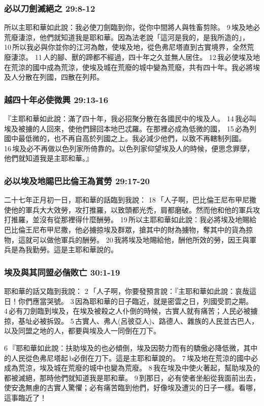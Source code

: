 \subsubsection{必以刀劍滅絕之 29:8-12}
所以主耶和華如此說：我必使刀劍臨到你，從你中間將人與牲畜剪除。 9 埃及地必荒廢淒涼，他們就知道我是耶和華。因為法老說「這河是我的，是我所造的」， 10 所以我必與你並你的江河為敵，使埃及地，從色弗尼塔直到古實境界，全然荒廢淒涼。 11 人的腳、獸的蹄都不經過，四十年之久並無人居住。 12 我必使埃及地在荒涼的國中成為荒涼，使埃及城在荒廢的城中變為荒廢，共有四十年。我必將埃及人分散在列國，四散在列邦。


\subsubsection{越四十年必使微興 29:13-16}
『主耶和華如此說：滿了四十年，我必招聚分散在各國民中的埃及人。 14 我必叫埃及被擄的人回來，使他們歸回本地巴忒羅。在那裡必成為低微的國， 15 必為列國中最低微的，也不再自高於列國之上。我必減少他們，以致不再轄制列國。 16 埃及必不再做以色列家所倚靠的。以色列家仰望埃及人的時候，便思念罪孽，他們就知道我是主耶和華。』

\subsubsection{必以埃及地賜巴比倫王為賞勞 29:17-20}
二十七年正月初一日，耶和華的話臨到我說： 18 「人子啊，巴比倫王尼布甲尼撒使他的軍兵大大效勞，攻打推羅，以致頭都光禿，肩都磨破。然而他和他的軍兵攻打推羅，並沒有從那裡得什麼酬勞。 19 所以主耶和華如此說：我必將埃及地賜給巴比倫王尼布甲尼撒，他必擄掠埃及群眾，搶其中的財為擄物，奪其中的貨為掠物，這就可以做他軍兵的酬勞。 20 我將埃及地賜給他，酬他所效的勞，因王與軍兵是為我勤勞。這是主耶和華說的。

\subsubsection{埃及與其同盟必偕敗亡 30:1-19}
耶和華的話又臨到我說： 2 「人子啊，你要發預言說：『主耶和華如此說：哀哉這日！你們應當哭號。 3 因為耶和華的日子臨近，就是密雲之日，列國受罰之期。 4 必有刀劍臨到埃及，在埃及被殺之人仆倒的時候，古實人就有痛苦；人民必被擄掠，基址必被拆毀。 5 古實人、弗人(呂彼亞人)、路德人、雜族的人民並古巴人，以及同盟之地的人，都要與埃及人一同倒在刀下。

6 『耶和華如此說：扶助埃及的也必傾倒，埃及因勢力而有的驕傲必降低微，其中的人民從色弗尼塔起 b必倒在刀下。這是主耶和華說的。 7 埃及地在荒涼的國中必成為荒涼，埃及城在荒廢的城中也變為荒廢。 8 我在埃及中使火著起，幫助埃及的都被滅絕，那時他們就知道我是耶和華。 9 到那日，必有使者坐船從我面前出去，使安逸無慮的古實人驚懼；必有痛苦臨到他們，好像埃及遭災的日子一樣。看哪，這事臨近了！

